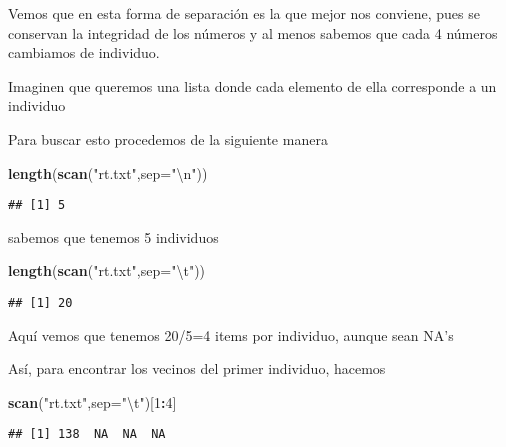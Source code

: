 \documentclass[]{article}
\newenvironment{Shaded}{\begin{snugshade}}{\end{snugshade}}
\newcommand{\KeywordTok}[1]{\textcolor[rgb]{0.13,0.29,0.53}{\textbf{#1}}}
\newcommand{\DataTypeTok}[1]{\textcolor[rgb]{0.13,0.29,0.53}{#1}}
\newcommand{\DecValTok}[1]{\textcolor[rgb]{0.00,0.00,0.81}{#1}}
\newcommand{\CharTok}[1]{\textcolor[rgb]{0.31,0.60,0.02}{#1}}
\newcommand{\StringTok}[1]{\textcolor[rgb]{0.31,0.60,0.02}{#1}}
\newcommand{\OperatorTok}[1]{\textcolor[rgb]{0.81,0.36,0.00}{\textbf{#1}}}
\newcommand{\NormalTok}[1]{#1}
\begin{document}
Vemos que en esta forma de separación es la que mejor nos conviene, pues
se conservan la integridad de los números y al menos sabemos que cada 4
números cambiamos de individuo.

Imaginen que queremos una lista donde cada elemento de ella corresponde
a un individuo

Para buscar esto procedemos de la siguiente manera

\begin{Shaded}
\begin{Highlighting}[]
\KeywordTok{length}\NormalTok{(}\KeywordTok{scan}\NormalTok{(}\StringTok{"rt.txt"}\NormalTok{,}\DataTypeTok{sep=}\StringTok{"}\CharTok{\textbackslash{}n}\StringTok{"}\NormalTok{))}
\end{Highlighting}
\end{Shaded}

\begin{verbatim}
## [1] 5
\end{verbatim}

sabemos que tenemos 5 individuos

\begin{Shaded}
\begin{Highlighting}[]
\KeywordTok{length}\NormalTok{(}\KeywordTok{scan}\NormalTok{(}\StringTok{"rt.txt"}\NormalTok{,}\DataTypeTok{sep=}\StringTok{"}\CharTok{\textbackslash{}t}\StringTok{"}\NormalTok{))}
\end{Highlighting}
\end{Shaded}

\begin{verbatim}
## [1] 20
\end{verbatim}

Aquí vemos que tenemos 20/5=4 items por individuo, aunque sean NA's

Así, para encontrar los vecinos del primer individuo, hacemos

\begin{Shaded}
\begin{Highlighting}[]
\KeywordTok{scan}\NormalTok{(}\StringTok{"rt.txt"}\NormalTok{,}\DataTypeTok{sep=}\StringTok{"}\CharTok{\textbackslash{}t}\StringTok{"}\NormalTok{)[}\DecValTok{1}\OperatorTok{:}\DecValTok{4}\NormalTok{]}
\end{Highlighting}
\end{Shaded}

\begin{verbatim}
## [1] 138  NA  NA  NA
\end{verbatim}
\end{document}
